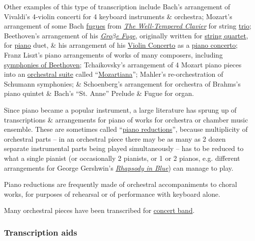 \documentclass{article}
\begin{document}
Other examples of this type of transcription include {\sc Bach}'s arrangement of {\sc Vivaldi}'s 4-violin concerti for 4 keyboard instruments \& orchestra; {\sc Mozart}'s arrangement of some Bach \href{https://en.wikipedia.org/wiki/Fugue}{fugues} from \href{https://en.wikipedia.org/wiki/The_Well-Tempered_Clavier}{\it The Well-Tempered Clavier} for string \href{https://en.wikipedia.org/wiki/Trio_(music)}{trio}; {\sc Beethoven}'s arrangement of his \href{https://en.wikipedia.org/wiki/Gro%C3%9Fe_Fuge}{\it Gro$\beta$e Fuge}, originally written for \href{https://en.wikipedia.org/wiki/String_quartet}{string quartet}, for \href{https://en.wikipedia.org/wiki/Piano}{piano} duet, \& his arrangement of his \href{https://en.wikipedia.org/wiki/Violin_Concerto_(Beethoven)}{Violin Concerto} as a \href{https://en.wikipedia.org/wiki/Piano_concerto}{piano concerto}; Franz Liszt's piano arrangements of works of many composers, including \href{https://en.wikipedia.org/wiki/Beethoven_Symphonies_(Liszt)}{symphonies of Beethoven}; {\sc Tchaikovsky}'s arrangement of 4 Mozart piano pieces into an \href{https://en.wikipedia.org/wiki/Orchestral_suite}{orchestral suite} called ``\href{https://en.wikipedia.org/wiki/Orchestral_Suite_No._4_Mozartiana_(Tchaikovsky)}{Mozartiana}''; {\sc Mahler}'s re-orchestration of {\sc Schumann} symphonies; \& {\sc Schoenberg}'s arrangement for orchestra of {\sc Brahms}'s piano quintet \& {\sc Bach}'s ``St. Anne'' Prelude \& Fugue for organ.

Since piano became a popular instrument, a large literature has sprung up of transcriptions \& arrangements for piano of works for orchestra or chamber music ensemble. These are sometimes called ``\href{https://en.wikipedia.org/wiki/Reduction_(music)}{piano reductions}'', because multiplicity of orchestral parts -- in an orchestral piece there may be as many as 2 dozen separate instrumental parts being played simultaneously -- has to be reduced to what a single pianist (or occasionally 2 pianists, or 1 or 2 pianos, e.g. different arrangements for {\sc George Gershwin}'s \href{https://en.wikipedia.org/wiki/Rhapsody_in_Blue}{\it Rhapsody in Blue}) can manage to play.

Piano reductions are frequently made of orchestral accompaniments to choral works, for purposes of rehearsal or of performance with keyboard alone.

Many orchestral pieces have been transcribed for \href{https://en.wikipedia.org/wiki/Concert_band}{concert band}.

\subsubsection{Transcription aids}
\end{document}
